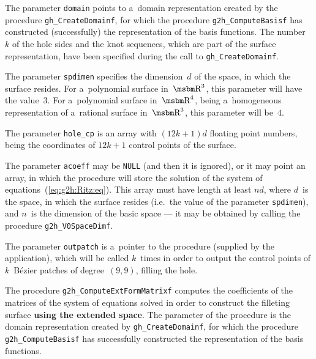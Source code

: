 \begin{sloppypar}
The parameter \texttt{domain} points to a~domain representation created
by the procedure \texttt{gh\_CreateDomainf}, for which the procedure
\texttt{g2h\_ComputeBasisf} has constructed (successfully) the representation
of the basis functions. The number~$k$ of the hole sides and the knot sequences,
which are part of the surface representation, have been specified during
the call to \texttt{gh\_CreateDomainf}.%
\end{sloppypar}

The parameter \texttt{spdimen} specifies the dimension~$d$ of the space,
in which the surface resides. For a~polynomial surface in~$\R^3$, this
parameter will have the value~$3$. For a~polynomial surface in~$\R^4$,
being a~homogeneous representation of a~rational surface in~$\R^3$,
this parameter will be~$4$.

The parameter \texttt{hole\_cp} is an array with $(12k+1)d$ floating point
numbers, being the coordinates of $12k+1$ control points of the surface.

The parameter \texttt{acoeff} may be \texttt{NULL} (and then it is ignored),
or it may point an array, in which the procedure will store the solution
of the system of equations~(\ref{eq:g2h:Ritz:eq}). This array must have
length at least $nd$, where $d$~is the space, in which the surface resides
(i.e.\ the value of the parameter \texttt{spdimen}), and $n$~is
the dimension of the basic space --- it may be obtained by calling the
procedure \texttt{g2h\_V0SpaceDimf}.

The parameter \texttt{outpatch} is a~pointer to the procedure (supplied
by the application), which will be called $k$~times in order to output
the control points of $k$~B\'{e}zier patches of degree~$(9,9)$, filling the
hole.


\vspace{\bigskipamount}
\begin{sloppypar}
The procedure \texttt{g2h\_ComputeExtFormMatrixf} computes the coefficients
of the matrices of the system of equations solved in order to construct
the filleting surface \textbf{using the extended space}. The parameter
of the procedure is the domain representation created by
\texttt{gh\_CreateDomainf}, for which the procedure \texttt{g2h\_ComputeBasisf}
has successfully constructed the representation of the basis functions.%
\end{sloppypar}

